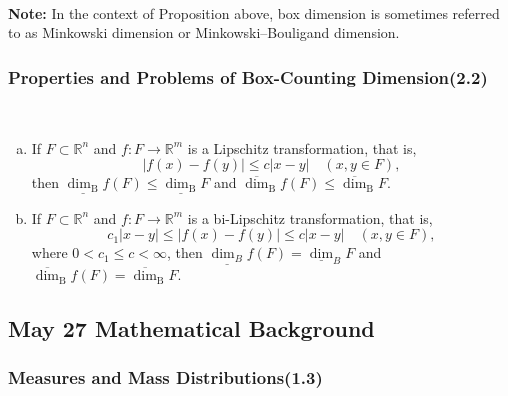 \textbf{\\Note: }In the context of Proposition above, box dimension is sometimes referred to as Minkowski dimension or Minkowski–Bouligand dimension.


\newpage
\subsubsection{Properties and Problems of Box-Counting Dimension(2.2)}



\begin{proposition}\label{prop2.5} $ $
    \begin{enumerate}[a.]
        \item If $F \subset \mathbb{R}^{n}$ and $f: F \rightarrow \mathbb{R}^{m}$ is a Lipschitz transformation, that is,
        $$
        |f(x)-f(y)| \leq c|x-y| \quad(x, y \in F),
        $$
        then $\underline{\operatorname{dim}_{\mathrm{B}}} f(F) \leq \underline{\operatorname{dim}_{\mathrm{B}}} F$ and $\overline{\operatorname{dim}}_{\mathrm{B}} f(F) \leq \overline{\operatorname{dim}}_{\mathrm{B}} F$.
        
        \item If $F \subset \mathbb{R}^{n}$ and $f: F \rightarrow \mathbb{R}^{m}$ is a bi-Lipschitz transformation, that is,
        $$
        c_{1}|x-y| \leq|f(x)-f(y)| \leq c|x-y| \quad(x, y \in F),
        $$
        where $0<c_{1} \leq c<\infty$, then $\underline{\operatorname{dim}_{B}} f(F)=\underline{\operatorname{dim}}_{B} F$ and
        $\overline{\operatorname{dim}}_{\mathrm{B}} f(F)=\overline{\operatorname{dim}}_{\mathrm{B}} F .$
        
    \end{enumerate}
\end{proposition}


\newpage

\subsection{May 27 Mathematical Background}
\subsubsection{Measures and Mass Distributions(1.3)}

